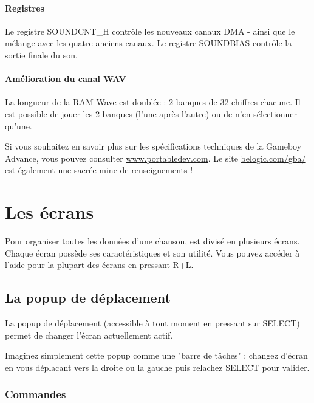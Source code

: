 \documentclass[12pt,a4paper]{article}
\begin{document}
    \paragraph{Registres} Le registre SOUNDCNT\_H contrôle les nouveaux canaux DMA - ainsi que le mélange avec les quatre anciens canaux.
                            Le registre SOUNDBIAS contrôle la sortie finale du son.

    \paragraph{Amélioration du canal WAV} La longueur de la RAM Wave est doublée : 2 banques de 32 chiffres chacune.
                            Il est possible de jouer les 2 banques (l'une après l'autre) ou de n'en sélectionner qu'une.

    \medskip
    Si vous souhaitez en savoir plus sur les spécifications techniques de la Gameboy Advance,
    vous pouvez consulter \href{http://www.portabledev.com/media/GBA/tutoriels/gbatek.htm}{www.portabledev.com}.
    Le site \href{http://belogic.com/gba/}{belogic.com/gba/} est également une sacrée mine de renseignements !

    \newpage
    \section{Les écrans}
  
    Pour organiser toutes les données d'une chanson, \FAT est divisé en plusieurs écrans.
    Chaque écran possède ses caractéristiques et son utilité.
    Vous pouvez accéder à l'aide pour la plupart des écrans en pressant R+L.
  
    \subsection{La popup de déplacement}
    
    La popup de déplacement (accessible à tout moment en pressant sur SELECT) permet de changer l'écran actuellement actif. 
    
    
    Imaginez simplement cette popup comme une "barre de tâches" : changez d'écran en vous déplacant vers la droite ou la gauche puis relachez SELECT pour valider.
    
    \subsubsection{Commandes}
\end{document}
